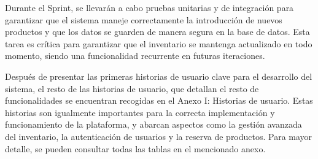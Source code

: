     \vspace{0.5cm}
    
    Durante el Sprint, se llevarán a cabo pruebas unitarias y de integración para garantizar que el sistema maneje correctamente la introducción de nuevos productos y que los datos se guarden de manera segura en la base de datos. Esta tarea es crítica para garantizar que el inventario se mantenga actualizado en todo momento, siendo una funcionalidad recurrente en futuras iteraciones.


\vspace{0.5cm}
\vspace{0.5cm}
Después de presentar las primeras historias de usuario clave para el desarrollo del sistema, el resto de las historias de usuario, que detallan el resto de funcionalidades se encuentran recogidas en el \textcolor{naranja}{Anexo I: Historias de usuario}. Estas historias son igualmente importantes para la correcta implementación y funcionamiento de la plataforma, y abarcan aspectos como la gestión avanzada del inventario, la autenticación de usuarios y la reserva de productos. Para mayor detalle, se pueden consultar todas las tablas en el mencionado anexo.

